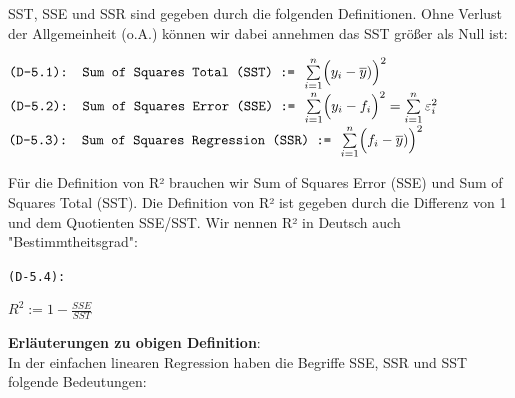 \documentclass[12pt]{article}
\begin{document}
%
SST, SSE und SSR sind gegeben durch die folgenden Definitionen. Ohne Verlust der Allgemeinheit (o.A.) können wir dabei annehmen das SST größer als Null ist:
\begin{center}
$ \texttt{(D-5.1): Sum of Squares Total (SST) := } \sum\limits_{i=1}^n \Bigl(y_i - \overline{y})\Bigr)^2 $ 
$ \texttt{(D-5.2): Sum of Squares Error (SSE) := } \sum\limits_{i=1}^n \Bigl(y_i - f_i\Bigr)^2 = \sum\limits_{i=1}^n \varepsilon_i^2 $
$ \texttt{(D-5.3): Sum of Squares Regression (SSR) := } \sum\limits_{i=1}^n \Bigl(f_i - \overline{y})\Bigr)^2 $  
\end{center}
Für die Definition von R² brauchen wir Sum of Squares Error (SSE) und Sum of Squares Total (SST). Die Definition von R² ist gegeben durch die Differenz von 1 und dem Quotienten SSE/SST. Wir nennen R² in Deutsch auch "Bestimmtheitsgrad":\\
\begin{center}
\texttt{(D-5.4):}
\begin{Large}  
\textbf{$ R^2 := 1 - \frac{SSE}{SST} $} \\[1.0cm]
\end{Large}   
\end{center}
% 
\textbf{Erläuterungen zu obigen Definition}:\\[0.4 cm]
%
In der einfachen linearen Regression haben die Begriffe SSE, SSR und SST folgende Bedeutungen:
\end{document}
